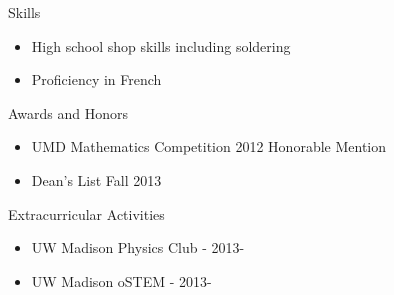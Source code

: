 \documentclass{letter}
\begin{document}
{\Large Skills}

\begin{itemize}
\item High school shop skills including soldering
\item Proficiency in French
\end{itemize}

{\Large Awards and Honors}

\begin{itemize}
\item UMD Mathematics Competition 2012 Honorable Mention
\item Dean's List Fall 2013
\end{itemize}

{\Large Extracurricular Activities}

\begin{itemize}
\item UW Madison Physics Club - 2013-
\item UW Madison oSTEM - 2013-
\end{itemize}
\end{document}
